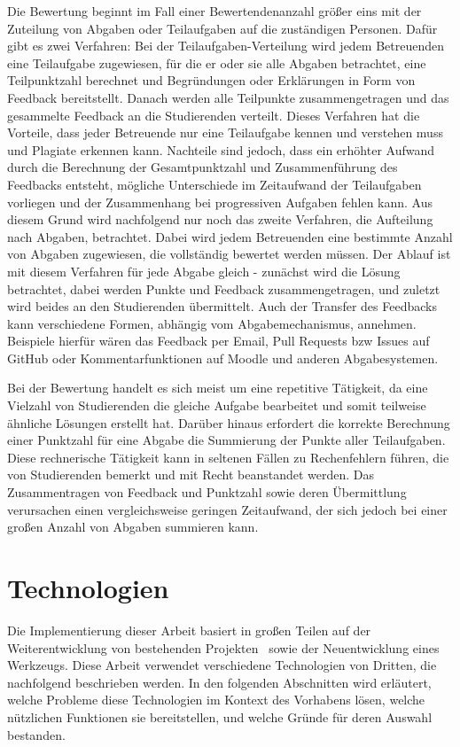 Die Bewertung beginnt im Fall einer Bewertendenanzahl größer eins mit der Zuteilung von Abgaben oder Teilaufgaben auf die zuständigen Personen.
Dafür gibt es zwei Verfahren:
Bei der Teilaufgaben-Verteilung wird jedem Betreuenden eine Teilaufgabe zugewiesen, für die er oder sie alle Abgaben betrachtet, eine Teilpunktzahl berechnet und Begründungen oder Erklärungen in Form von Feedback bereitstellt.
Danach werden alle Teilpunkte zusammengetragen und das gesammelte Feedback an die Studierenden verteilt.
Dieses Verfahren hat die Vorteile, dass jeder Betreuende nur eine Teilaufgabe kennen und verstehen muss und Plagiate erkennen kann.
Nachteile sind jedoch, dass ein erhöhter Aufwand durch die Berechnung der Gesamtpunktzahl und Zusammenführung des Feedbacks entsteht, mögliche Unterschiede im Zeitaufwand der Teilaufgaben vorliegen und der Zusammenhang bei progressiven Aufgaben fehlen kann.
Aus diesem Grund wird nachfolgend nur noch das zweite Verfahren, die Aufteilung nach Abgaben, betrachtet.
Dabei wird jedem Betreuenden eine bestimmte Anzahl von Abgaben zugewiesen, die vollständig bewertet werden müssen.
Der Ablauf ist mit diesem Verfahren für jede Abgabe gleich - zunächst wird die Lösung betrachtet, dabei werden Punkte und Feedback zusammengetragen, und zuletzt wird beides an den Studierenden übermittelt.
Auch der Transfer des Feedbacks kann verschiedene Formen, abhängig vom Abgabemechanismus, annehmen.
Beispiele hierfür wären das Feedback per Email, Pull Requests \ac{bzw} Issues auf GitHub oder Kommentarfunktionen auf Moodle und anderen Abgabesystemen.

Bei der Bewertung handelt es sich meist um eine repetitive Tätigkeit, da eine Vielzahl von Studierenden die gleiche Aufgabe bearbeitet und somit teilweise ähnliche Lösungen erstellt hat.
Darüber hinaus erfordert die korrekte Berechnung einer Punktzahl für eine Abgabe die Summierung der Punkte aller Teilaufgaben.
Diese rechnerische Tätigkeit kann in seltenen Fällen zu Rechenfehlern führen, die von Studierenden bemerkt und mit Recht beanstandet werden.
Das Zusammentragen von Feedback und Punktzahl sowie deren Übermittlung verursachen einen vergleichsweise geringen Zeitaufwand, der sich jedoch bei einer großen Anzahl von Abgaben summieren kann.

\section{Technologien}\label{sec:tech}

Die Implementierung dieser Arbeit basiert in großen Teilen auf der Weiterentwicklung von bestehenden Projekten~\cite{bachelor-thesis} sowie der Neuentwicklung eines Werkzeugs.
Diese Arbeit verwendet verschiedene Technologien von Dritten, die nachfolgend beschrieben werden.
In den folgenden Abschnitten wird erläutert, welche Probleme diese Technologien im Kontext des Vorhabens lösen, welche nützlichen Funktionen sie bereitstellen, und welche Gründe für deren Auswahl bestanden.

